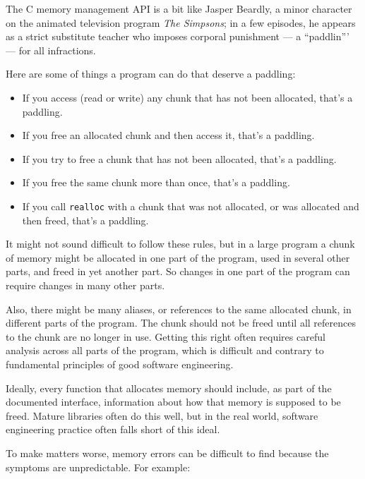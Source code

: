 \documentclass[12pt]{book}
\begin{document}
{The C memory management API is a bit like Jasper Beardly, a minor
character on the animated television program {\it The Simpsons}; 
in a few episodes, he appears as a strict substitute teacher who imposes corporal punishment --- a ``paddlin''' --- for all infractions.

Here are some of things a program can do that deserve a paddling:

\begin{itemize}

\item If you access (read or write) any chunk that has not been
allocated, that's a paddling.

\item If you free an allocated chunk and then access it, that's
a paddling.

\item If you try to free a chunk that has not been allocated,
that's a paddling.

\item If you free the same chunk more than once, that's a paddling.

\item If you call {\tt realloc} with a chunk that was not allocated,
or was allocated and then freed, that's a paddling.

\end{itemize}

It might not sound difficult to follow these rules, but in a large
program a chunk of memory might be allocated in one part of the
program, used in several other parts, and freed in yet another
part.  So changes in one part of the program can require changes
in many other parts.

Also, there might be many aliases, or references to the same allocated
chunk, in different parts of the program.  The chunk should not be
freed until all references to the chunk are no longer in use.  
Getting this right often requires careful analysis across all parts
of the program, which is difficult and contrary to fundamental
principles of good software engineering.

Ideally, every function that allocates memory should include, as part
of the documented interface, information about how that memory is supposed
to be freed.  Mature libraries often do this well, but in the real world,
software engineering practice often falls short of this ideal.

To make matters worse, memory errors can be difficult
to find because the symptoms are unpredictable.  For example:

}
\end{document}
